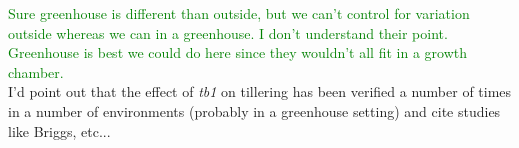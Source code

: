 \documentclass[11pt]{article}
\newcommand{\lev}[1]{\noindent \textcolor{green}{{#1}} \\}
\newcommand{\mbh}[1]{\noindent \textcolor{Dandelion}{{#1}}\\}
\begin{document}
\lev{Sure greenhouse is different than outside, but we can't control for variation outside whereas we can in a greenhouse. I don't understand their point. Greenhouse is best we could do here since they wouldn't all fit in a growth chamber.}

\mbh{I'd point out that the effect of \emph{tb1} on tillering has been verified a number of times in a number of environments (probably in a greenhouse setting) and cite studies like Briggs, etc...}


\end{document}
